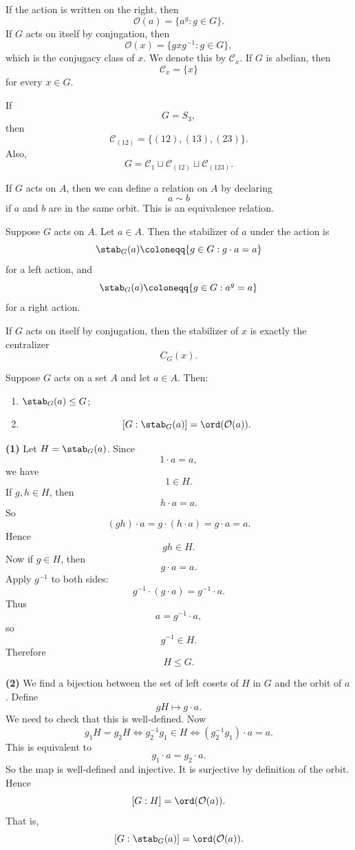 If the action is written on the right, then
\[
    \mathcal{O}(a)=\{a^g:g\in G\}.
\]
If $G$ acts on itself by conjugation, then
\[
    \mathcal{O}(x)=\{gxg^{-1}:g\in G\},
\]
which is the conjugacy class of $x$.
We denote this by $\mathcal{C}_x$.
If $G$ is abelian, then
\[
    \mathcal{C}_x=\{x\}
\]
for every $x\in G$.

\begin{example}
    If
    \[
        G=S_3,
    \]
    then
    \[
        \mathcal{C}_{(12)}=\{(12),(13),(23)\}.
    \]
    Also,
    \[
        G=\mathcal{C}_1\sqcup \mathcal{C}_{(12)}\sqcup \mathcal{C}_{(123)}.
    \]
\end{example}

If $G$ acts on $A$, then we can define a relation on $A$ by declaring
\[
    a\sim b
\]
if $a$ and $b$ are in the same orbit.
This is an equivalence relation.

\begin{definition}[Stabilizer]
    Suppose $G$ acts on $A$.
    Let $a\in A$.
    Then the stabilizer of $a$ under the action is
    \[
        \stab_G(a)\coloneqq \{g\in G:g\cdot a=a\}
    \]
    for a left action, and
    \[
        \stab_G(a)\coloneqq \{g\in G:a^g=a\}
    \]
    for a right action.
\end{definition}

If $G$ acts on itself by conjugation, then the stabilizer of $x$ is exactly the centralizer
\[
    C_G(x).
\]

\begin{theorem}{
    Suppose $G$ acts on a set $A$ and let $a\in A$.
    Then:
    \begin{enumerate}
        \item $\stab_G(a)\leq G$;
        \item
        \[
            [G:\stab_G(a)] = \ord(\mathcal{O}(a)).
        \]
    \end{enumerate}
}
    \textbf{(1)}
    Let $H=\stab_G(a)$.
    Since
    \[
        1\cdot a=a,
    \]
    we have
    \[
        1\in H.
    \]
    If $g,h\in H$, then
    \[
        h\cdot a=a.
    \]
    So
    \[
        (gh)\cdot a=g\cdot(h\cdot a)=g\cdot a=a.
    \]
    Hence
    \[
        gh\in H.
    \]
    Now if $g\in H$, then
    \[
        g\cdot a=a.
    \]
    Apply $g^{-1}$ to both sides:
    \[
        g^{-1}\cdot(g\cdot a)=g^{-1}\cdot a.
    \]
    Thus
    \[
        a=g^{-1}\cdot a,
    \]
    so
    \[
        g^{-1}\in H.
    \]
    Therefore
    \[
        H\leq G.
    \]

    \textbf{(2)}
    We find a bijection between the set of left cosets of $H$ in $G$ and the orbit of $a$.
    Define
    \[
        gH \longmapsto g\cdot a.
    \]
    We need to check that this is well-defined.
    Now
    \[
        g_{1}H=g_{2}H
        \iff g_2^{-1}g_1\in H
        \iff (g_2^{-1}g_1)\cdot a=a.
    \]
    This is equivalent to
    \[
        g_1\cdot a=g_2\cdot a.
    \]
    So the map is well-defined and injective.
    It is surjective by definition of the orbit.
    Hence
    \[
        [G:H]=\ord(\mathcal{O}(a)).
    \]
    That is,
    \[
        [G:\stab_G(a)] = \ord(\mathcal{O}(a)).
    \]
\end{theorem}

